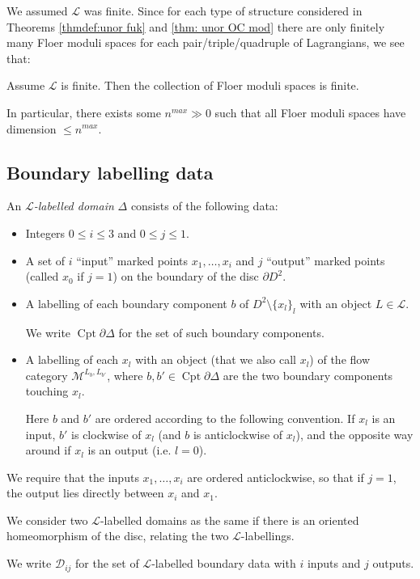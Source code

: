 \documentclass{TPmod}
\newcommand{\Cptd}{\operatorname{Cpt}\partial}
\newcommand{\cD}{\mathcal{D}}
\newcommand{\cL}{\mathcal{L}}
\newcommand{\cM}{\mathcal{M}}
\numberwithin{equation}{section}
\begin{document}
    We assumed $\cL$ was finite. Since for each type of structure considered in Theorems \ref{thmdef:unor fuk} and \ref{thm: unor OC mod} there are only finitely many Floer moduli spaces for each pair/triple/quadruple of Lagrangians, we see that:
    \begin{lem}\label{lem: fin many mod spac}
        Assume $\cL$ is finite. Then the collection of Floer moduli spaces is finite. 
        
        In particular, there exists some $n^{max} \gg 0$ such that all Floer moduli spaces have dimension $\leq n^{max}$.
    \end{lem}

\subsection{Boundary labelling data}
    \begin{defn}\label{def: 8.8}
        An \emph{$\cL$-labelled domain} $\Delta$ consists of the following data:
        \begin{itemize}
            \item Integers $0 \leq i \leq 3$ and $0 \leq j \leq 1$.
            \item A set of $i$ ``input'' marked points $x_1, \ldots, x_i$ and $j$ ``output'' marked points (called $x_0$ if $j=1$) on the boundary of the disc $\partial D^2$.
            \item A labelling of each boundary component $b$ of $D^2 \setminus \{x_l\}_l$ with an object $L \in \cL$.

            We write $\Cptd\Delta$ for the set of such boundary components.
            \item A labelling of each $x_l$ with an object (that we also call $x_l$) of the flow category $\cM^{L_{b}, L_{b'}}$, where $b, b' \in \Cptd \Delta$ are the two boundary components touching $x_l$.

            Here $b$ and $b'$ are ordered according to the following convention. If $x_l$ is an input, $b'$ is clockwise of $x_l$ (and $b$ is anticlockwise of $x_l$), and the opposite way around if $x_l$ is an output (i.e. $l=0$).

            
        \end{itemize}
        We require that the inputs $x_1, \ldots, x_i$ are ordered anticlockwise, so that if $j=1$, the output lies directly between $x_i$ and $x_1$. 

        
        We consider two $\cL$-labelled domains as the same if there is an oriented homeomorphism of the disc, relating the two $\cL$-labellings.

        We write $\cD_{ij}$ for the set of $\cL$-labelled boundary data with $i$ inputs and $j$ outputs.
    \end{defn}
\end{document}
